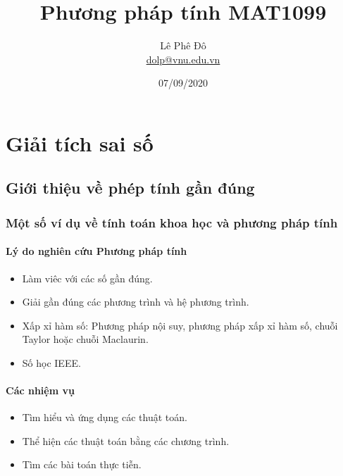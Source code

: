 \documentclass{book}
\author{Lê Phê Đô \\ \href{mailto:dolp@vnu.edu.vn}{dolp@vnu.edu.vn}}
\date{07/09/2020}
\title{Phương pháp tính MAT1099}
\def\blankpage{%
  \clearpage%
  \thispagestyle{empty}%
  \addtocounter{page}{-1}%
  \null%
  \clearpage}
\begin{document}
\maketitle

\blankpage

\tableofcontents

\iftotalfigures
  \listoffigures
\fi

\iftotaltables
  \listoftables
\fi



\chapter{Giải tích sai số}

\section{Giới thiệu về phép tính gần đúng}

\subsection{Một số ví dụ về tính toán khoa học và phương pháp tính}

\subsubsection{Lý do nghiên cứu Phương pháp tính}

\begin{itemize}
    \item Làm viêc với các số gần đúng.
    \item Giải gần đúng các phương trình và hệ phương trình.
    \item Xấp xỉ hàm số: Phương pháp nội suy, phương pháp xấp xỉ hàm số, chuỗi
        Taylor hoặc chuỗi Maclaurin.
    \item Số học IEEE\@.    %
\end{itemize}

\subsubsection{Các nhiệm vụ}

\begin{itemize}
    \item Tìm hiểu và ứng dụng các thuật toán.
    \item Thể hiện các thuật toán bằng các chương trình.
    \item Tìm các bài toán thực tiễn.
\end{itemize}
\end{document}
